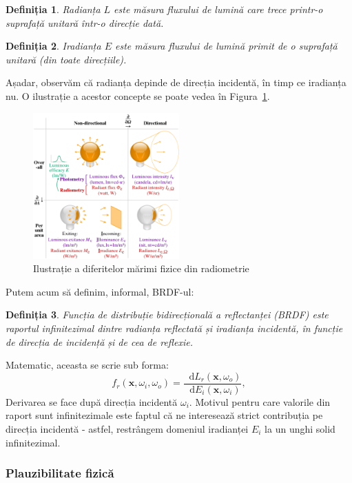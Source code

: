 \documentclass[12pt,a4paper]{report}
\newcommand*\diff{\mathop{}\!\mathrm{d}}
\newtheorem{definition}{Definiția}
\numberwithin{equation}{section} %
\begin{document}
\begin{definition}
	Radianța $L$ este măsura fluxului de lumină care trece printr-o suprafață unitară într-o direcție dată.
\end{definition}
\begin{definition}
	Iradianța $E$ este măsura fluxului de lumină primit de o suprafață unitară (din toate direcțiile).
\end{definition}

Așadar, observăm că radianța depinde de direcția incidentă, în timp ce iradianța
nu. O ilustrație a acestor concepte se poate vedea în Figura~\ref{fig:radiance}.
\begin{figure}[ht]
	\centering
	\includegraphics[width=0.5\textwidth]{pics/radiometry.png}
	\caption{Ilustrație a diferitelor mărimi fizice din radiometrie\protect{}}
	\label{fig:radiance}
\end{figure}

Putem acum să definim, informal, BRDF-ul:
\begin{definition}
	Funcția de distribuție bidirecțională a reflectanței (BRDF) este raportul infinitezimal
	dintre radianța reflectată și iradianța incidentă, în funcție de direcția de incidență și de cea de reflexie.
\end{definition}
Matematic, aceasta se scrie sub forma:
\begin{equation}
	f_r(\mathbf{x}, \omega_i, \omega_o) = \frac{\diff L_r(\mathbf{x}, \omega_o)}{\diff E_i(\mathbf{x}, \omega_i)},
\end{equation}
Derivarea se face după direcția incidentă $\omega_i$. Motivul pentru care valorile din
raport sunt infinitezimale este faptul că ne interesează strict contribuția pe direcția
incidentă - astfel, restrângem domeniul iradianței $E_i$ la un unghi solid infinitezimal.

\subsubsection*{Plauzibilitate fizică}
\end{document}
